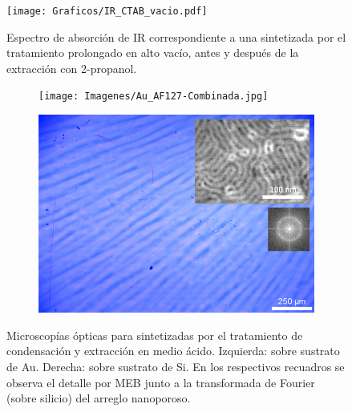 		 \begin{figure}
			 	\centering
			 	\texttt{[image: Graficos/IR\_CTAB\_vacio.pdf]}
			 	\caption[FTIR \pdmC\space tratamiento prolongado.]{Espectro de absorción de IR correspondiente a una \pdmC\space sintetizada por el tratamiento prolongado en alto vacío, antes y después de la extracción con 2-propanol.}
			 	\label{fig:IR_CTAB_vacio}
			 	\end{figure}

    	
    	
     	     \begin{figure}
	 	   	    \begin{subfigure}{0.495\textwidth}
		       	\texttt{[image: Imagenes/Au\_AF127-Combinada.jpg]}
		   		\end{subfigure}
		   		\begin{subfigure}{0.495\textwidth}
		   	    \includegraphics[width=\textwidth]{Imagenes/Si_AF127-Combinada.jpg}
		   		\end{subfigure}
				 \caption[Microscopía óptica \pdmF tratamiento en medio ácido.]{Microscopías ópticas para \pdmF\space sintetizadas por el tratamiento de condensación y extracción en medio ácido. Izquierda: sobre sustrato de Au. Derecha: sobre sustrato de Si. En los respectivos recuadros se observa el detalle por MEB junto a la transformada de Fourier (sobre silicio) del arreglo nanoporoso.}
				 \label{fig:Microscopia_F127_acido}	
			     \end{figure}
   		
